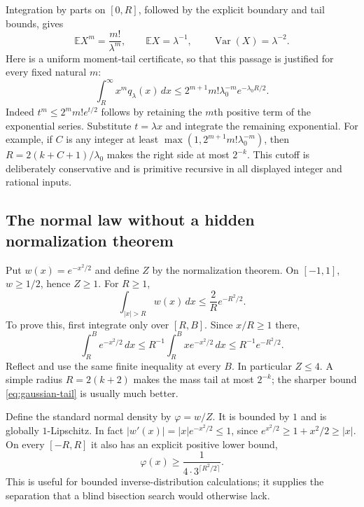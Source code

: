 Integration by parts on $[0,R]$, followed by the explicit boundary and tail
bounds, gives
\begin{equation}
 \mathbb E X^m=\frac{m!}{\lambda^m},\qquad
 \mathbb E X=\lambda^{-1},\qquad
 \operatorname{Var}(X)=\lambda^{-2}.
 \label{eq:exponential-moments}
\end{equation}
Here is a uniform moment-tail certificate, so that this passage is justified
for every fixed natural $m$:
\begin{equation}
 \int_R^\infty x^m q_\lambda(x)\,dx
 \leq 2^{m+1}m!\lambda_0^{-m}e^{-\lambda_0R/2}.
 \label{eq:exponential-tail}
\end{equation}
Indeed $t^m\leq2^m m!e^{t/2}$ follows by retaining the $m$th positive term of
the exponential series.  Substitute $t=\lambda x$ and integrate the remaining
exponential.  For example, if $C$ is any integer at least
$\max(1,2^{m+1}m!\lambda_0^{-m})$, then
$R=2(k+C+1)/\lambda_0$ makes the right side at most $2^{-k}$.
This cutoff is deliberately conservative and is primitive recursive in all
displayed integer and rational inputs.

\subsection{The normal law without a hidden normalization theorem}

Put $w(x)=e^{-x^2/2}$ and define $Z$ by the normalization theorem.  On
$[-1,1]$, $w\geq1/2$, hence $Z\geq1$.  For $R\geq1$,
\begin{equation}
 \int_{|x|>R}w(x)\,dx
 \leq \frac{2}{R}e^{-R^2/2}.
 \label{eq:gaussian-tail}
\end{equation}
To prove this, first integrate only over $[R,B]$.  Since $x/R\geq1$ there,
\[
 \int_R^B e^{-x^2/2}\,dx
 \leq R^{-1}\int_R^B x e^{-x^2/2}\,dx
 \leq R^{-1}e^{-R^2/2}.
\]
Reflect and use the same finite inequality at every $B$.  In particular
$Z\leq4$.  A simple radius $R=2(k+2)$ makes the mass tail at most $2^{-k}$;
the sharper bound \eqref{eq:gaussian-tail} is usually much better.

Define the standard normal density by $\varphi=w/Z$.  It is bounded by $1$
and is globally $1$-Lipschitz.  In fact
$|w'(x)|=|x|e^{-x^2/2}\leq1$, since
$e^{x^2/2}\geq1+x^2/2\geq|x|$.
On every $[-R,R]$ it also has an explicit positive lower bound,
\begin{equation}
 \varphi(x)\geq\frac{1}{4\cdot3^{\lceil R^2/2\rceil}}.
 \label{eq:gaussian-slope}
\end{equation}
This is useful for bounded inverse-distribution calculations; it supplies
the separation that a blind bisection search would otherwise lack.

